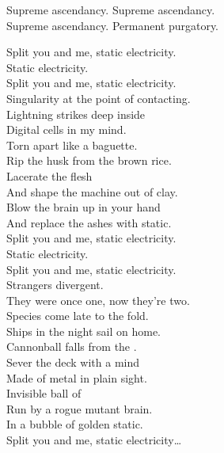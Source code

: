 Supreme ascendancy. Supreme ascendancy. \\
Supreme ascendancy. Permanent purgatory. \\





Split you and me, static electricity. \\
Static electricity. \\
Split you and me, static electricity. \\

Singularity at the point of contacting. \\
Lightning strikes deep inside \\
Digital cells in my mind. \\
Torn apart like a baguette. \\
Rip the husk from the brown rice. \\
Lacerate the  flesh \\
And shape the machine out of clay. \\
Blow the brain up in your hand \\
And replace the ashes with static. \\

Split you and me, static electricity. \\
Static electricity. \\
Split you and me, static electricity. \\

Strangers divergent. \\
They were once one, now they're two. \\
Species come late to the fold. \\
Ships in the night sail on home. \\
Cannonball falls from the . \\
Sever the deck with a mind \\
Made of metal in plain sight. \\
Invisible ball of  \\
Run by a rogue mutant brain. \\
In a bubble of golden static. \\

Split you and me, static electricity… \\

